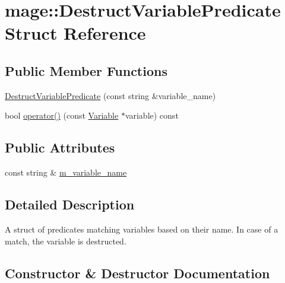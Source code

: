 \hypertarget{structmage_1_1_destruct_variable_predicate}{}\section{mage\+:\+:Destruct\+Variable\+Predicate Struct Reference}
\label{structmage_1_1_destruct_variable_predicate}
\subsection*{Public Member Functions}
\begin{DoxyCompactItemize}
\item 
\hyperlink{structmage_1_1_destruct_variable_predicate_a4591cb3a6cebf790ceebeb0f4e2c7c2c}{Destruct\+Variable\+Predicate} (const string \&variable\+\_\+name)
\item 
bool \hyperlink{structmage_1_1_destruct_variable_predicate_ad75df157dde6e4ba34810cb035a7bc74}{operator()} (const \hyperlink{structmage_1_1_variable}{Variable} $\ast$variable) const
\end{DoxyCompactItemize}
\subsection*{Public Attributes}
\begin{DoxyCompactItemize}
\item 
const string \& \hyperlink{structmage_1_1_destruct_variable_predicate_ab601ffdcc5c709dd8e4b35aa451148c2}{m\+\_\+variable\+\_\+name}
\end{DoxyCompactItemize}


\subsection{Detailed Description}
A struct of predicates matching variables based on their name. In case of a match, the variable is destructed. 

\subsection{Constructor \& Destructor Documentation}
\hypertarget{structmage_1_1_destruct_variable_predicate_a4591cb3a6cebf790ceebeb0f4e2c7c2c}{}\label{structmage_1_1_destruct_variable_predicate_a4591cb3a6cebf790ceebeb0f4e2c7c2c} 
